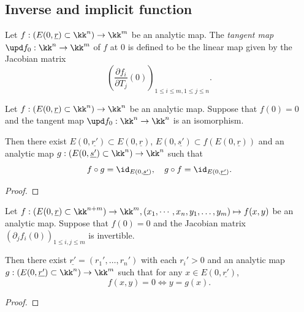 \subsection{Inverse and implicit function}

    \begin{definition}\label{def:tangent_map_of_an_analytic_map}
        Let \(f:(E(0,\underline{r}) \subset \kk^n) \to \kk^m\) be an analytic map.
        The \emph{tangent map} \(\upd f_0:\kk^n \to \kk^m\) of \(f\) at \(0\) is defined to be the linear map
        given by the Jacobian matrix
        \[\left(\frac{\partial f_i}{\partial T_j}(0)\right)_{1 \leq i \leq m, 1 \leq j \leq n}.\]
    \end{definition}

    \begin{theorem}\label{thm:inverse_function_theorem_over_NA_fields}
        Let \(f:(E(0,\underline{r}) \subset \kk^n) \to \kk^n\) be an analytic map.
        Suppose that \(f(0) = 0\) and the tangent map \(\upd f_0:\kk^n \to \kk^n\) is an isomorphism.
        
        Then there exist \(E(0,\underline{r'}) \subset E(0,\underline{r})\), \(E(0,\underline{s'}) \subset f(E(0,\underline{r}))\) and an analytic map
        \(g:(E(0,\underline{s'}) \subset \kk^n) \to \kk^n\)
        such that 
        \[f \circ g = \id_{E(0,\underline{s'})}, \quad g \circ f = \id_{E(0,\underline{r'})}.\]
    \end{theorem}
    \begin{proof}
    \end{proof}

    \begin{theorem}\label{thm:implicit_function_theorem_over_NA_fields}
        Let \(f:(E(0,\underline{r}) \subset \kk^{n+m}) \to \kk^m, (x_1,\cdots,x_n,y_1,\ldots,y_m) \mapsto f(x,y)\) be an analytic map.
        Suppose that \(f(0) = 0\) and the Jacobian matrix \(\left(\partial_j f_i(0)\right)_{1 \leq i,j \leq m}\) is invertible.
        
        Then there exist \(\underline{r'} = (r_1',\ldots,r_n')\) with each \(r_i' > 0\)
        and an analytic map \(g:(E(0,\underline{r'}) \subset \kk^n) \to \kk^m\)
        such that for any \(x \in E(0,\underline{r'})\),
        \[f(x, y) = 0 \iff y = g(x).\]
    \end{theorem}
    \begin{proof}
    \end{proof}

